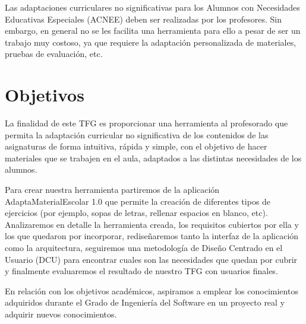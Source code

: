 Las adaptaciones curriculares no significativas para los Alumnos con Necesidades Educativas Especiales (ACNEE) deben ser realizadas por los profesores. Sin embargo, en general no se les facilita una herramienta para ello a pesar de ser un trabajo muy costoso, ya que requiere la adaptación personalizada de materiales, pruebas de evaluación, etc.

\section{Objetivos}\label{cap:objetivos}
La finalidad de este TFG es proporcionar una herramienta al profesorado que permita la adaptación curricular no significativa de los contenidos de las asignaturas de forma intuitiva, rápida y simple, con el objetivo de hacer materiales que se trabajen en el aula, adaptados a las distintas necesidades de los alumnos.

Para crear nuestra herramienta partiremos de la aplicación AdaptaMaterialEscolar 1.0  que permite la creación de diferentes tipos de ejercicios (por ejemplo, sopas de letras, rellenar espacios en blanco, etc). Analizaremos en detalle la herramienta creada, los requisitos cubiertos por ella y los que quedaron por incorporar, rediseñaremos tanto la interfaz de la aplicación como la arquitectura, seguiremos una metodología de Diseño Centrado en el Usuario (DCU) para encontrar cuales son las necesidades que quedan por cubrir y finalmente evaluaremos el resultado de nuestro TFG con usuarios finales.
 
En relación con los objetivos académicos, aspiramos a emplear los conocimientos adquiridos durante el Grado de Ingeniería del Software en un proyecto real y adquirir nuevos conocimientos.



